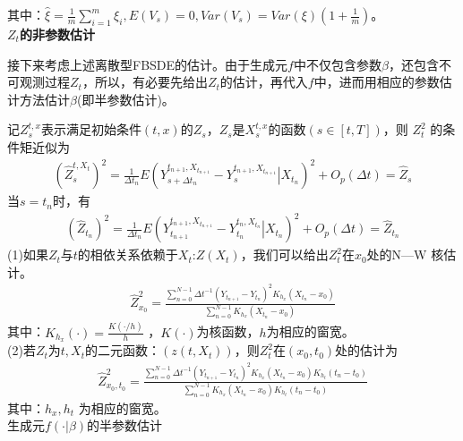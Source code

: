 		其中：$\hat \xi  = \frac{1}{m}\sum\limits_{i = 1}^m {{\xi _i}},E(V_s)=0,Var(V_s)=Var(\xi)(1+\frac 1m) $。\\
		\textbf{$Z_t$的非参数估计}
		\par
		接下来考虑上述离散型FBSDE的估计。由于生成元$f$中不仅包含参数$\beta$，还包含不可观测过程$Z_t$，所以，有必要先给出$Z_t$的估计，再代入$f$中，进而用相应的参数估计方法估计$\beta$(即半参数估计)。
		\par
		记$Z_s^{t,x}$表示满足初始条件$(t,x)$的$Z_s$，$Z_s$是$X_s^{t,x}$的函数$(s \in [t,T])$，则 $Z_t^{2}$ 的条件矩近似为
		\begin{align*}
		{\left( {\hat Z_s^{t,{X_t}}} \right)^2} = \frac{1}{{\Delta {t_n}}}E{\left( {Y_{s + \Delta {t_n}}^{{t_{n + 1}},{X_{{t_{n + 1}}}}} - Y_s^{{t_{n + 1}},{X_{{t_{n + 1}}}}}\left| {{X_{{t_n}}}} \right.} \right)^2} + {O_p}\left( {\Delta {t}} \right) = {{\hat Z}_s}\end{align*}
		当$s=t_n$时，有
		\begin{align*}
		{\left( {\hat Z _{t_n}} \right)^2} = \frac{1}{{\Delta {t_n}}}E{\left( {Y_{{t_{n + 1}}}^{{t_{n + 1}},{X_{{t_{n + 1}}}}} - Y_{{t_n}}^{{t_{n}},{X_{{t_{n }}}}}\left| {{X_{{t_n}}}} \right.} \right)^2} + {O_p}\left( {\Delta {t}} \right) = {{\hat Z}_{{t_n}}}\end{align*}
		(1)如果$Z_t$与$t$的相依关系依赖于$X_t$:$Z(X_t)$，我们可以给出$Z_t^2$在$x_0$处的N—W 核估计。
		\begin{align*}
		\hat Z_{{x_0}}^2 = \frac{{\sum\limits_{n = 0}^{N - 1} {\Delta t^{ - 1}{{\left( {{Y_{{t_{n + 1}}}} - {Y_{{t_n}}}} \right)}^2}{K_{{h_x}}}\left( {{X_{{t_n}}} - {x_0}} \right)} }}{{\sum\limits_{n = 0}^{N - 1} {{K_{{h_x}}}\left( {{X_{{t_n}}} - {x_0}} \right)} }}\end{align*}
		其中：${{K_{{h_x}}}\left(  \cdot  \right) = \frac{{K\left( { \cdot /h} \right)}}{h}}$ ，$K(\cdot)$为核函数，$h$为相应的窗宽。\\
		(2)若$Z_t$为$t,X_t$的二元函数：$(z(t,X_t))$，则$Z_t^2$在$(x_0,t_0)$处的估计为
		\begin{align*}
		\hat Z_{{x_0},{t_0}}^2 = \frac{{\sum\limits_{n = 0}^{N - 1} {\Delta t^{ - 1}{{\left( {{Y_{{t_{n + 1}}}} - {Y_{{t_n}}}} \right)}^2}{K_{{h_x}}}\left( {{X_{{t_n}}} - {x_0}} \right){K_{{h_t}}}\left( {{t_n} - {t_0}} \right)} }}{{\sum\limits_{n = 0}^{N - 1} {{K_{{h_x}}}\left( {{X_{{t_n}}} - {x_0}} \right){K_{{h_t}}}\left( {{t_n} - {t_0}} \right)} }}\end{align*}
		其中：$h_x,h_t$ 为相应的窗宽。\\
		生成元$f(\cdot|\beta)$的半参数估计
